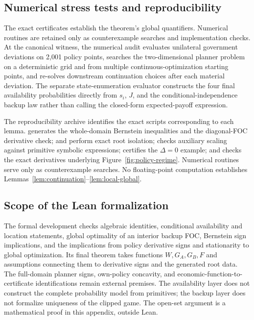 \subsection{Numerical stress tests and reproducibility}\label{app:continuation}

The exact certificates establish the theorem's global quantifiers. Numerical routines are retained only as counterexample searches and implementation checks. At the canonical witness, the numerical audit evaluates unilateral government deviations on 2,001 policy points, searches the two-dimensional planner problem on a deterministic grid and from multiple continuous-optimization starting points, and re-solves downstream continuation choices after each material deviation. The separate state-enumeration evaluator constructs the four final availability probabilities directly from $s_i$, $J$, and the conditional-independence backup law rather than calling the closed-form expected-payoff expression.

The reproducibility archive identifies the exact scripts corresponding to each lemma.  generates the whole-domain Bernstein inequalities and the diagonal-FOC derivative check;  and  perform exact root isolation;  checks auxiliary scaling against primitive symbolic expressions;  certifies the $\Delta=0$ example; and  checks the exact derivatives underlying Figure~\ref{fig:policy-regime}. Numerical routines serve only as counterexample searches. No floating-point computation establishes Lemmas~\ref{lem:continuation}--\ref{lem:local-global}.

\subsection{Scope of the Lean formalization}\label{app:formal-scope}

The formal development checks algebraic identities, conditional availability and location statements, global optimality of an interior backup FOC, Bernstein sign implications, and the implications from policy derivative signs and stationarity to global optimization. Its final theorem takes functions $W,G_A,G_B,F$ and assumptions connecting them to derivative signs and the generated root data. The full-domain planner signs, own-policy concavity, and economic-function-to-certificate identifications remain external premises. The availability layer does not construct the complete probability model from primitives; the backup layer does not formalize uniqueness of the clipped game. The open-set argument is a mathematical proof in this appendix, outside Lean.

